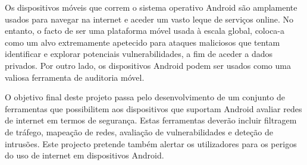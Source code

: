Os dispositivos móveis que correm o sistema operativo Android são amplamente usados para navegar na internet e aceder um vasto leque de serviços online. No entanto, o facto de ser uma plataforma móvel usada à escala global, coloca-a como um alvo extremamente apetecido para ataques maliciosos que tentam identificar e explorar potenciais vulnerabilidades, a fim de aceder a dados privados. Por outro lado, os dispositivos Android podem ser usados como uma valiosa ferramenta de auditoria móvel.

O objetivo final deste projeto passa pelo desenvolvimento de um conjunto de ferramentas que possibilitem aos dispositivos que suportam Android avaliar redes de internet em termos de segurança. Estas ferramentas deverão incluir filtragem de tráfego, mapeação de redes, avaliação de vulnerabilidades e deteção de intrusões. Este projecto pretende também alertar os utilizadores para os perigos do uso de internet em dispositivos Android.